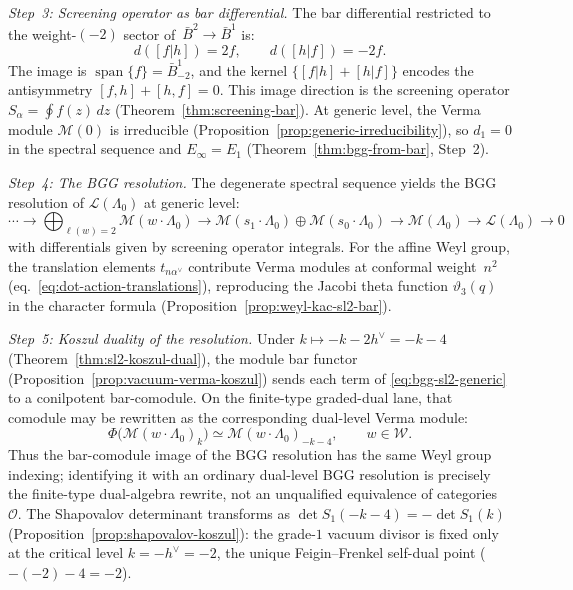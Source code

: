 \begin{computation}
\emph{Step~3: Screening operator as bar differential.}
The bar differential restricted to the weight-$(-2)$ sector
of~$\bar{B}^2 \to \bar{B}^1$ is:
\[
d([f|h]) = 2f, \qquad d([h|f]) = -2f.
\]
The image is $\operatorname{span}\{f\} = \bar{B}^1_{-2}$,
and the kernel $\{[f|h] + [h|f]\}$ encodes the antisymmetry
$[f,h] + [h,f] = 0$. This image direction is the
screening operator $S_\alpha = \oint f(z)\,dz$
(Theorem~\ref{thm:screening-bar}). At generic level, the
Verma module $\mathcal{M}(0)$ is irreducible
(Proposition~\ref{prop:generic-irreducibility}), so
$d_1 = 0$ in the spectral sequence and $E_\infty = E_1$
(Theorem~\ref{thm:bgg-from-bar}, Step~2).

\emph{Step~4: The BGG resolution.}
The degenerate spectral sequence yields the BGG resolution
of $\mathcal{L}(\Lambda_0)$ at generic level:
\begin{equation}\label{eq:bgg-sl2-generic}
\cdots \to \bigoplus_{\ell(w)=2} \mathcal{M}(w \cdot \Lambda_0)
\to \mathcal{M}(s_1 \cdot \Lambda_0)
 \oplus \mathcal{M}(s_0 \cdot \Lambda_0)
\to \mathcal{M}(\Lambda_0) \to \mathcal{L}(\Lambda_0) \to 0
\end{equation}
with differentials given by screening operator integrals.
For the affine Weyl group, the translation elements
$t_{n\alpha^\vee}$ contribute Verma modules at conformal
weight~$n^2$ (eq.~\eqref{eq:dot-action-translations}),
reproducing the Jacobi theta function $\vartheta_3(q)$ in the
character formula
(Proposition~\ref{prop:weyl-kac-sl2-bar}).

\emph{Step~5: Koszul duality of the resolution.}
Under $k \mapsto -k - 2h^\vee = -k-4$
(Theorem~\ref{thm:sl2-koszul-dual}), the module bar functor
(Proposition~\ref{prop:vacuum-verma-koszul}) sends each term of
\eqref{eq:bgg-sl2-generic} to a conilpotent bar-comodule. On the
finite-type graded-dual lane, that comodule may be rewritten as the
corresponding dual-level Verma module:
\[
\Phi\bigl(\mathcal{M}(w \cdot \Lambda_0)_k\bigr)
\simeq \mathcal{M}(w \cdot \Lambda_0)_{-k-4},
\qquad w \in \mathcal{W}.
\]
Thus the bar-comodule image of the BGG resolution has the same Weyl
group indexing; identifying it with an ordinary dual-level BGG
resolution is precisely the finite-type dual-algebra rewrite, not an
unqualified equivalence of categories~$\mathcal O$.
The Shapovalov determinant transforms as
$\det S_1(-k-4) = -\det S_1(k)$
(Proposition~\ref{prop:shapovalov-koszul}): the grade-$1$ vacuum
divisor is fixed only at the critical level
$k = -h^\vee = -2$, the unique Feigin--Frenkel self-dual point
($-(-2)-4 = -2$).


\end{computation}
